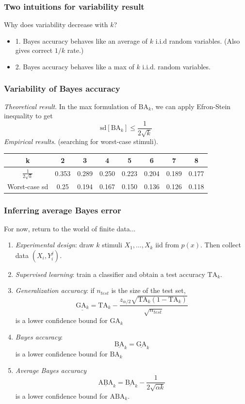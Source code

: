 \documentclass{beamer}
\begin{document}
\begin{frame}
\frametitle{Two intuitions for variability result}
Why does variability decrease with $k$?
\begin{itemize}
\item 1. Bayes accuracy behaves like an average of $k$ i.i.d random variables. (Also gives correct $1/k$ rate.)
\item 2. Bayes accuracy behaves like a max of $k$ i.i.d. random variables.
\end{itemize}
\end{frame}

\begin{frame}
\frametitle{Variability of Bayes accuracy}

\emph{Theoretical result}. In the max formulation of $\text{BA}_k$, we
can apply Efron-Stein inequality to get
\[
\text{sd}[\text{BA}_k] \leq \frac{1}{2\sqrt{k}}
\]
\vspace{0.2in}\pause
\emph{Empirical results}. (searching for worst-case stimuli).
\begin{tabular}{c||c|c|c|c|c|c|c}
k & 2 & 3 & 4 & 5 & 6 & 7 & 8\\\hline
$\frac{1}{2\sqrt{k}}$ & 0.353 & 0.289 & 0.250 & 0.223 & 0.204 & 0.189 & 0.177\\\hline
Worst-case sd & 0.25 & 0.194 & 0.167 & 0.150 & 0.136 & 0.126 & 0.118
\end{tabular}
\end{frame}

\begin{frame}
\frametitle{Inferring average Bayes error}
For now, return to the world of finite data...
\begin{enumerate}
\item \emph{Experimental design}: draw $k$ stimuli $X_1,...,X_k$ iid from $p(x)$.  Then collect data $(X_i, Y_i^j)$. \pause
\item \emph{Supervised learning}: train a classifier and obtain a test accuracy $\text{TA}_k$. \pause
\item \emph{Generalization accuracy}: if $n_{test}$ is the size of the test set,
\[
\underline{\text{GA}_k} = \text{TA}_k - \frac{z_{\alpha/2}\sqrt{\text{TA}_k (1-\text{TA}_k)}}{\sqrt{n_{test}}}
\]
 is a lower confidence bound for $\text{GA}_k$ \pause
\item \emph{Bayes accuracy}:
\[
\underline{\text{BA}}_k =  \underline{\text{GA}}_k
\]
is a lower confidence bound for $\text{BA}_k$ \pause
\item \emph{Average Bayes accuracy}
\[
\underline{\text{ABA}}_k =  \underline{\text{BA}}_k - \frac{1}{2\sqrt{\alpha k}}
\]
is a lower confidence bound for $\text{ABA}_k$. \pause
\end{enumerate}
\end{frame}
\end{document}

